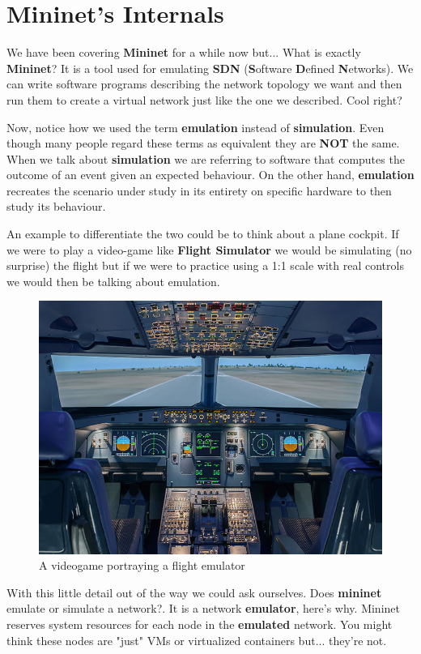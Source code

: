 \documentclass[12pt]{article}
\newcommand{\newpar} {
    \vskip 1cm
}
\begin{document}
\section{Mininet's Internals}
	We have been covering \textbf{Mininet} for a while now but... What is exactly \textbf{Mininet}? It is a tool used for emulating \textbf{SDN} (\textbf{S}oftware \textbf{D}efined \textbf{N}etworks). We can write software programs describing the network topology we want and then run them to create a virtual network just like the one we described. Cool right?
	\newpar
	Now, notice how we used the term \textbf{emulation} instead of \textbf{simulation}. Even though many people regard these terms as equivalent they are \textbf{NOT} the same. When we talk about \textbf{simulation} we are referring to software that computes the outcome of an event given an expected behaviour. On the other hand, \textbf{emulation} recreates the scenario under study in its entirety on specific hardware to then study its behaviour.
	\newpar
	An example to differentiate the two could be to think about a plane cockpit. If we were to play a video-game like \textbf{Flight Simulator} we would be simulating (no surprise) the flight but if we were to practice using a 1:1 scale with real controls we would then be talking about emulation.

	\begin{figure}[!htb]
		\centering
		\includegraphics[width=0.7\linewidth]{emulation.png}
		\caption{A videogame portraying a flight emulator}
		\label{f:emulator}
	\end{figure}

	With this little detail out of the way we could ask ourselves. Does \textbf{mininet} emulate or simulate a network?. It is a network \textbf{emulator}, here's why. Mininet reserves system resources for each node in the \textbf{emulated} network. You might think these nodes are "just" VMs or virtualized containers but... they're not.
	
\end{document}
